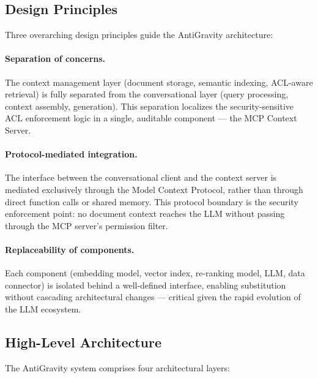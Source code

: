 \subsection{Design Principles}

Three overarching design principles guide the AntiGravity architecture:

\paragraph{Separation of concerns.} The context management layer (document storage, semantic indexing, ACL-aware retrieval) is fully separated from the conversational layer (query processing, context assembly, generation). This separation localizes the security-sensitive ACL enforcement logic in a single, auditable component --- the MCP Context Server.

\paragraph{Protocol-mediated integration.} The interface between the conversational client and the context server is mediated exclusively through the Model Context Protocol, rather than through direct function calls or shared memory. This protocol boundary is the security enforcement point: no document context reaches the LLM without passing through the MCP server's permission filter.

\paragraph{Replaceability of components.} Each component (embedding model, vector index, re-ranking model, LLM, data connector) is isolated behind a well-defined interface, enabling substitution without cascading architectural changes --- critical given the rapid evolution of the LLM ecosystem.

\subsection{High-Level Architecture}

The AntiGravity system comprises four architectural layers:

